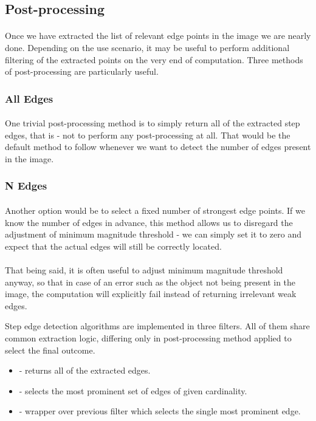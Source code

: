 \subsection{Post-processing}

\paragraph*{}
Once we have extracted the list of relevant edge points in the image we are nearly done. Depending on the use scenario, it may be useful to perform additional filtering of the extracted points on the very end of computation. Three methods of post-processing are particularly useful.

\subsubsection{All Edges}
\paragraph*{}
One trivial post-processing method is to simply return all of the extracted step edges, that is - not to perform any post-processing at all. That would be the default method to follow whenever we want to detect the number of edges present in the image.

\subsubsection{N Edges}
\paragraph*{}
Another option would be to select a fixed number of strongest edge points. If we know the number of edges in advance, this method allows us to disregard the adjustment of minimum magnitude threshold - we can simply set it to zero and expect that the actual edges will still be correctly located. 

\paragraph*{}
That being said, it is often useful to adjust minimum magnitude threshold anyway, so that in case of an error such as the object not being present in the image, the computation will explicitly fail instead of returning irrelevant weak edges. 

\begin{refImpl}
Step edge detection algorithms are implemented in three \studio filters. All of them share common extraction logic, differing only in post-processing method applied to select the final outcome.
\begin{itemize}
	\item {} - returns all of the extracted edges.
	\item {} - selects the most prominent set of edges of given cardinality.
	\item {} - wrapper over previous filter which selects the single most prominent edge.
\end{itemize} 
\end{refImpl}
